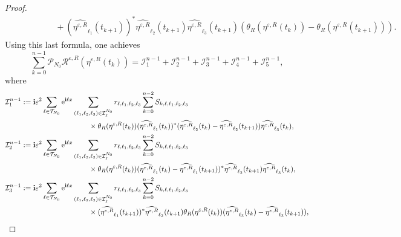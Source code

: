 \documentclass[a4paper]{amsart}
\begin{document}
\begin{proof}
\begin{align*}
   &\hspace{2cm}+(\widehat{\eta^{\varepsilon,R}}_{\ell_1}(t_{k+1}))^*\widehat{\eta^{\varepsilon,R}}_{\ell_2}(t_{k+1})\widehat{\eta^{\varepsilon,R}}_{\ell_3}(t_{k+1})(\theta_R(\eta^{\varepsilon,R}(t_k))-\theta_R(\eta^{\varepsilon,R}(t_{k+1}))).
\end{align*}
Using this last formula, one achieves
\begin{equation}
    \label{p_0}
    \sum_{k=0}^{n-1} \mathcal{P}_{N_0} \mathcal{R}^{\varepsilon,R}(\eta^{\varepsilon,R}(t_k)) = \mathcal{I}^{n-1}_1+\mathcal{I}^{n-1}_2+\mathcal{I}^{n-1}_3+\mathcal{I}^{n-1}_4+\mathcal{I}^{n-1}_5,
\end{equation}
where
\begin{align*}
    &\mathcal{I}_1^{n-1}:={\bf i}\varepsilon^2 \sum_{\ell\in\mathcal{T}_{N_0}}{\rm e}^{{\bf i}\ell x}\sum_{(\ell_1,\ell_2,\ell_3)\in\mathcal{I}_{\ell}^{N_0}}
    r_{\ell,\ell_1,\ell_2,\ell_3}\sum_{k=0}^{n-2}S_{k,\ell,\ell_1,\ell_2,\ell_3}\\
    &\hspace{4cm}\times \theta_R(\eta^{\varepsilon,R}(t_k)) (\widehat{\eta^{\varepsilon,R}}_{\ell_1}(t_k))^*(\widehat{\eta^{\varepsilon,R}}_{\ell_2}(t_k)-\widehat{\eta^{\varepsilon,R}}_{\ell_2}(t_{k+1}))\widehat{\eta^{\varepsilon,R}}_{\ell_3}(t_k),\\
    &\mathcal{I}_2^{n-1}:={\bf i}\varepsilon^2 \sum_{\ell\in\mathcal{T}_{N_0}}{\rm e}^{{\bf i}\ell x}\sum_{(\ell_1,\ell_2,\ell_3)\in\mathcal{I}_{\ell}^{N_0}}
    r_{\ell,\ell_1,\ell_2,\ell_3}\sum_{k=0}^{n-2}S_{k,\ell,\ell_1,\ell_2,\ell_3}\\
    &\hspace{4cm}\times \theta_R(\eta^{\varepsilon,R}(t_k)) (\widehat{\eta^{\varepsilon,R}}_{\ell_1}(t_k)-\widehat{\eta^{\varepsilon,R}}_{\ell_1}(t_{k+1}))^*\widehat{\eta^{\varepsilon,R}}_{\ell_2}(t_{k+1})\widehat{\eta^{\varepsilon,R}}_{\ell_3}(t_k),\\
    &\mathcal{I}_3^{n-1}:={\bf i}\varepsilon^2 \sum_{\ell\in\mathcal{T}_{N_0}}{\rm e}^{{\bf i}\ell x}\sum_{(\ell_1,\ell_2,\ell_3)\in\mathcal{I}_{\ell}^{N_0}}
    r_{\ell,\ell_1,\ell_2,\ell_3}\sum_{k=0}^{n-2}S_{k,\ell,\ell_1,\ell_2,\ell_3}\\
    &\hspace{4cm}\times (\widehat{\eta^{\varepsilon,R}}_{\ell_1}(t_{k+1}))^*\widehat{\eta^{\varepsilon,R}}_{\ell_2}(t_{k+1})\theta_R(\eta^{\varepsilon,R}(t_k))(\widehat{\eta^{\varepsilon,R}}_{\ell_3}(t_k)-\widehat{\eta^{\varepsilon,R}}_{\ell_3}(t_{k+1})),\\

\end{align*}
\end{proof}
\end{document}
